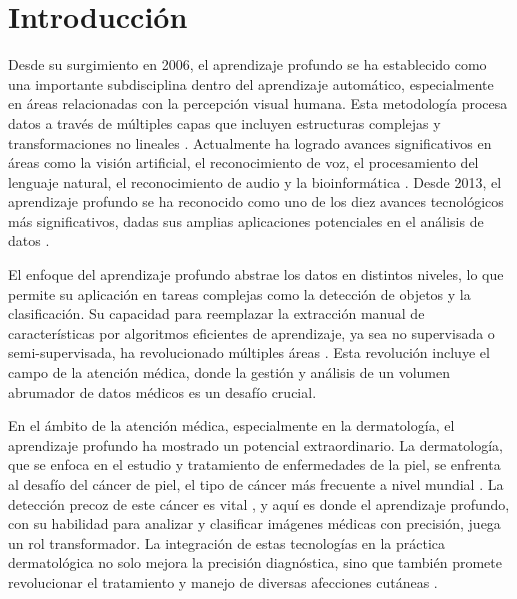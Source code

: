 \chapter*{Introducción}\label{chapter:introduction}

Desde su surgimiento en 2006, el aprendizaje profundo se ha establecido como una importante subdisciplina dentro del aprendizaje automático, especialmente en áreas relacionadas con la percepción visual humana. Esta metodología procesa datos a través de múltiples capas que incluyen estructuras complejas y transformaciones no lineales . Actualmente ha logrado avances significativos en áreas como la visión artificial, el reconocimiento de voz, el procesamiento del lenguaje natural, el reconocimiento de audio y la bioinformática . Desde 2013, el aprendizaje profundo se ha reconocido como uno de los diez avances tecnológicos más significativos, dadas sus amplias aplicaciones potenciales en el análisis de datos .

El enfoque del aprendizaje profundo abstrae los datos en distintos niveles, lo que permite su aplicación en tareas complejas como la detección de objetos y la clasificación. Su capacidad para reemplazar la extracción manual de características por algoritmos eficientes de aprendizaje, ya sea no supervisada o semi-supervisada, ha revolucionado múltiples áreas . Esta revolución incluye el campo de la atención médica, donde la gestión y análisis de un volumen abrumador de datos médicos es un desafío crucial.

En el ámbito de la atención médica, especialmente en la dermatología, el aprendizaje profundo ha mostrado un potencial extraordinario. La dermatología, que se enfoca en el estudio y tratamiento de enfermedades de la piel, se enfrenta al desafío del cáncer de piel, el tipo de cáncer más frecuente a nivel mundial . La detección precoz de este cáncer es vital , y aquí es donde el aprendizaje profundo, con su habilidad para analizar y clasificar imágenes médicas con precisión, juega un rol transformador. La integración de estas tecnologías en la práctica dermatológica no solo mejora la precisión diagnóstica, sino que también promete revolucionar el tratamiento y manejo de diversas afecciones cutáneas .

